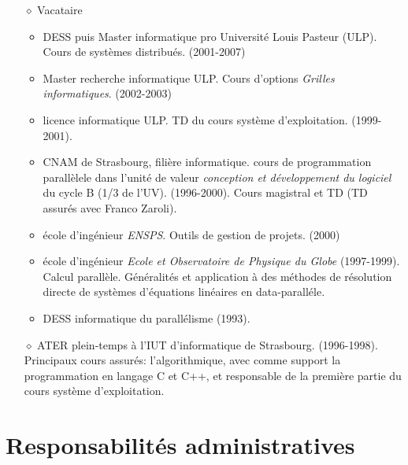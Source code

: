 \begin{itemize}
\item [$\diamond$]
Vacataire 
\begin{itemize}
\item DESS puis Master informatique pro Université Louis Pasteur (ULP). Cours de systèmes distribués. (2001-2007) 
\item Master recherche informatique ULP. Cours d'options {\em Grilles informatiques}. (2002-2003)
\item licence informatique ULP. TD du cours système d'exploitation. (1999-2001). 
\item CNAM de Strasbourg, filière informatique. 
cours de programmation parallèlele dans l'unité de valeur {\em conception et développement du logiciel} 
du cycle B (1/3 de l'UV). (1996-2000).
Cours magistral et TD (TD assurés avec Franco Zaroli).
\item école d'ingénieur \textit{ENSPS}. Outils de gestion de projets. (2000)
\item école d'ingénieur \emph{Ecole et Observatoire de Physique du Globe} (1997-1999).
Calcul parallèle. Généralités et application à des méthodes de résolution directe de systèmes d'équations 
linéaires en data-paralléle. 
\item DESS informatique du parallélisme (1993).\\[2mm]
\end{itemize}

\item [$\diamond$]
ATER plein-temps à l'IUT d'informatique de Strasbourg. (1996-1998). 
Principaux cours assurés: l'algorithmique, avec comme support la programmation en langage C et C++, 
et responsable de la première partie du cours système d'exploitation. \\[2mm]


\end{itemize}





\section{Responsabilités administratives}


